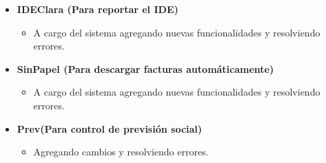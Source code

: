 \documentclass[11pt,a4paper,sans,colorlinks]{moderncv} %
\begin{document}
{\begin{itemize}
\begin{itemize}
          \begin{itemize}
            \item Modelado y codificación de la nueva Nómina 1.2, cumpliendo con las especificaciones del SAT.
            \item Modelado y codificación de la nueva facturación electrónica (CFDI 3.3), cumpliendo con las especificaciones del SAT.
            \item A cargo del sistema agregando nuevas funcionalidades y resolviendo errores.
          \end{itemize}
        \item \textbf{IDEClara (Para reportar el IDE)}
          \begin{itemize}
            \item A cargo del sistema agregando nuevas funcionalidades y resolviendo errores.
          \end{itemize}
        \item \textbf{SinPapel (Para descargar facturas automáticamente)}
          \begin{itemize}
            \item A cargo del sistema agregando nuevas funcionalidades y resolviendo errores.
          \end{itemize}
        \item \textbf{Prev(Para control de previsión social)}
          \begin{itemize}
            \item Agregando cambios y resolviendo errores.
          \end{itemize}
      \end{itemize}
  \end{itemize}}

\end{document}

